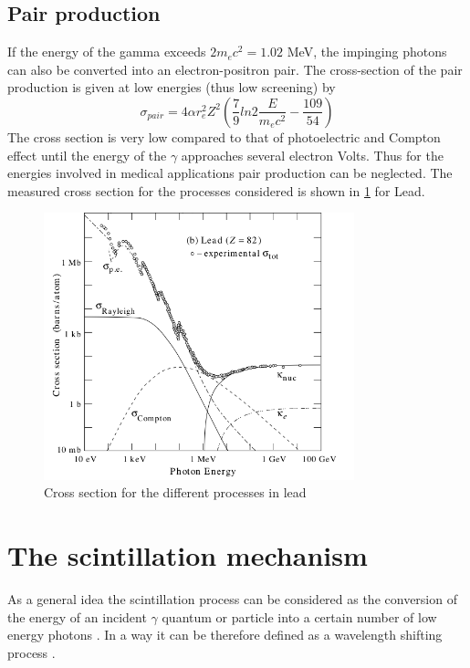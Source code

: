 \subsection{Pair production}

If the energy of the gamma exceeds $2m_{e}c^{2} = 1.02$ MeV, the impinging photons can also be converted into an electron-positron pair. The cross-section of the pair production is given at low energies (thus low screening) by
\begin{equation}
\sigma _{pair} = 4\alpha r_{e}^{2} Z^{2} \left( \frac{7}{9}ln2\frac{E}{m_{e}c^{2}} - \frac{109}{54}\right)
\end{equation}
The cross section is very low compared to that of photoelectric and Compton effect until the energy of the $\gamma$ approaches several electron Volts. Thus for the energies involved in medical applications pair production can be neglected.
The measured cross section for the processes considered is shown in \ref{fig:cross_section} for Lead. 

\begin{figure}
\centering
\includegraphics[width=9cm]{../Pictures/Chapter_2/sigma_gamma.pdf}
\caption[$\gamma$ cross section]{Cross section for the different processes in lead}
\label{fig:cross_section}
\end{figure}
\newpage
\section{The scintillation mechanism}

As a general idea the scintillation process can be considered as the conversion of the energy of an incident $\gamma$ quantum or particle into a certain number of low energy photons \cite{Rodnyi1997}. In a way it can be therefore defined as a wavelength shifting process \cite{Lecoq2006}.

